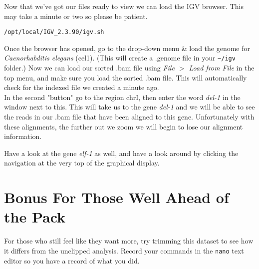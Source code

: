 \begin{steps}
Now that we've got our files ready to view we can load the IGV browser.
This may take a minute or two so please be patient.

\begin{lstlisting}
/opt/local/IGV_2.3.90/igv.sh
\end{lstlisting}
\end{steps}

\begin{steps}
Once the browser has opened, go to the drop-down menu \& load the genome for \textit{Caenorhabditis elegans} (cel1).
(This will create a .genome file in your \texttt{\~{}/igv} folder.)
Now we can load our sorted .bam file using  \textit{File $>$ Load from File} in the top menu, and make sure you load the sorted .bam file.
This will automatically check for the indexed file we created a minute ago. \\

In the second "button" go to the region chrI, then enter the word \textit{del-1} in the window next to this.
This will take us to the gene \textit{del-1} and we will be able to see the reads in our .bam file that have been aligned to this gene.
Unfortunately with these alignments, the further out we zoom we will begin to lose our alignment information.

Have a look at the gene \textit{elf-1} as well, and have a look around by clicking the navigation at the very top of the graphical display.
\end{steps}

\section{Bonus For Those Well Ahead of the Pack}
\begin{advanced}
For those who still feel like they want more, try trimming this dataset to see how it differs from the unclipped analysis.
Record your commands in the \texttt{nano} text editor so you have a record of what you did.
\end{advanced}
